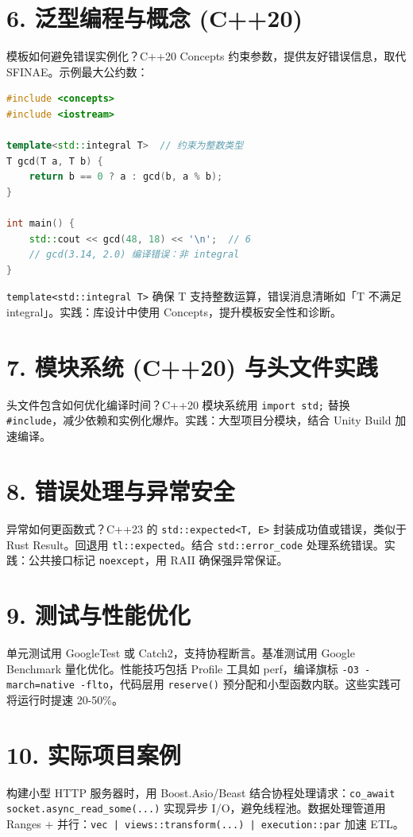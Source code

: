 \chapter{6. 泛型编程与概念 (C++20)}
模板如何避免错误实例化？C++20 Concepts 约束参数，提供友好错误信息，取代 SFINAE。示例最大公约数：\par
\begin{lstlisting}[language=cpp]
#include <concepts>
#include <iostream>

template<std::integral T>  // 约束为整数类型
T gcd(T a, T b) {
    return b == 0 ? a : gcd(b, a % b);
}

int main() {
    std::cout << gcd(48, 18) << '\n';  // 6
    // gcd(3.14, 2.0) 编译错误：非 integral
}
\end{lstlisting}
\texttt{template<std::integral T>} 确保 T 支持整数运算，错误消息清晰如「T 不满足 integral」。实践：库设计中使用 Concepts，提升模板安全性和诊断。\par
\chapter{7. 模块系统 (C++20) 与头文件实践}
头文件包含如何优化编译时间？C++20 模块系统用 \texttt{import std;} 替换 \texttt{\#{}include}，减少依赖和实例化爆炸。实践：大型项目分模块，结合 Unity Build 加速编译。\par
\chapter{8. 错误处理与异常安全}
异常如何更函数式？C++23 的 \texttt{std::expected<T, E>} 封装成功值或错误，类似于 Rust Result。回退用 \texttt{tl::expected}。结合 \texttt{std::error\_{}code} 处理系统错误。实践：公共接口标记 \texttt{noexcept}，用 RAII 确保强异常保证。\par
\chapter{9. 测试与性能优化}
单元测试用 GoogleTest 或 Catch2，支持协程断言。基准测试用 Google Benchmark 量化优化。性能技巧包括 Profile 工具如 perf，编译旗标 \texttt{-O3 -march=native -flto}，代码层用 \texttt{reserve()} 预分配和小型函数内联。这些实践可将运行时提速 20-50\%{}。\par
\chapter{10. 实际项目案例}
构建小型 HTTP 服务器时，用 Boost.Asio/Beast 结合协程处理请求：\texttt{co\_{}await socket.async\_{}read\_{}some(...)} 实现异步 I/O，避免线程池。数据处理管道用 Ranges + 并行：\texttt{vec | views::transform(...) | execution::par} 加速 ETL。\par
